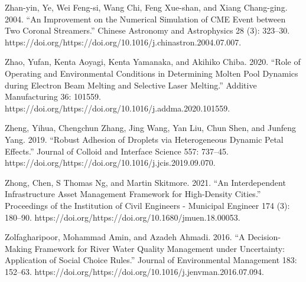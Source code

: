 \documentclass[utf8]{gradu3}
\begin{document}
Zhan-yin, Ye, Wei Feng-si, Wang Chi, Feng Xue-shan, and Xiang Chang-ging. 2004. “An Improvement on the Numerical Simulation of CME Event between Two Coronal Streamers.” Chinese Astronomy and Astrophysics 28 (3): 323–30. https://doi.org/https://doi.org/10.1016/j.chinastron.2004.07.007.

Zhao, Yufan, Kenta Aoyagi, Kenta Yamanaka, and Akihiko Chiba. 2020. “Role of Operating and Environmental Conditions in Determining Molten Pool Dynamics during Electron Beam Melting and Selective Laser Melting.” Additive Manufacturing 36: 101559. https://doi.org/https://doi.org/10.1016/j.addma.2020.101559.

Zheng, Yihua, Chengchun Zhang, Jing Wang, Yan Liu, Chun Shen, and Junfeng Yang. 2019. “Robust Adhesion of Droplets via Heterogeneous Dynamic Petal Effects.” Journal of Colloid and Interface Science 557: 737–45. https://doi.org/https://doi.org/10.1016/j.jcis.2019.09.070.

Zhong, Chen, S Thomas Ng, and Martin Skitmore. 2021. “An Interdependent Infrastructure Asset Management Framework for High-Density Cities.” Proceedings of the Institution of Civil Engineers - Municipal Engineer 174 (3): 180–90. https://doi.org/https://doi.org/10.1680/jmuen.18.00053.

Zolfagharipoor, Mohammad Amin, and Azadeh Ahmadi. 2016. 
“A Decision-Making Framework for River Water Quality Management under Uncertainty:
Application of Social Choice Rules.” Journal of Environmental Management 183: 152–63.
https://doi.org/https://doi.org/10.1016/j.jenvman.2016.07.094.
\end{document}
